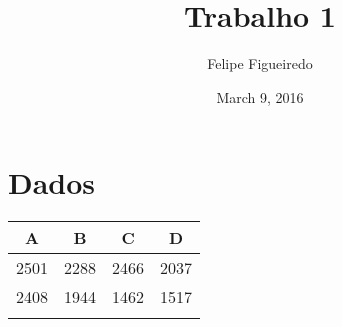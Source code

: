 \documentclass[]{article}
\title{Trabalho 1}
\author{Felipe Figueiredo}
\date{March 9, 2016}
\begin{document}
\maketitle


\section{Dados}\label{dados}

\begin{longtable}[c]{@{}cccc@{}}
\toprule
\begin{minipage}[b]{0.06\columnwidth}\centering\strut
A
\strut\end{minipage} &
\begin{minipage}[b]{0.06\columnwidth}\centering\strut
B
\strut\end{minipage} &
\begin{minipage}[b]{0.06\columnwidth}\centering\strut
C
\strut\end{minipage} &
\begin{minipage}[b]{0.06\columnwidth}\centering\strut
D
\strut\end{minipage}\tabularnewline
\midrule
\endhead
\begin{minipage}[t]{0.06\columnwidth}\centering\strut
2501
\strut\end{minipage} &
\begin{minipage}[t]{0.06\columnwidth}\centering\strut
2288
\strut\end{minipage} &
\begin{minipage}[t]{0.06\columnwidth}\centering\strut
2466
\strut\end{minipage} &
\begin{minipage}[t]{0.06\columnwidth}\centering\strut
2037
\strut\end{minipage}\tabularnewline
\begin{minipage}[t]{0.06\columnwidth}\centering\strut
2408
\strut\end{minipage} &
\begin{minipage}[t]{0.06\columnwidth}\centering\strut
1944
\strut\end{minipage} &
\begin{minipage}[t]{0.06\columnwidth}\centering\strut
1462
\strut\end{minipage} &
\begin{minipage}[t]{0.06\columnwidth}\centering\strut
1517
\strut\end{minipage}\tabularnewline
\begin{minipage}[t]{0.06\columnwidth}\centering\strut

\end{minipage}
\end{longtable}
\end{document}
